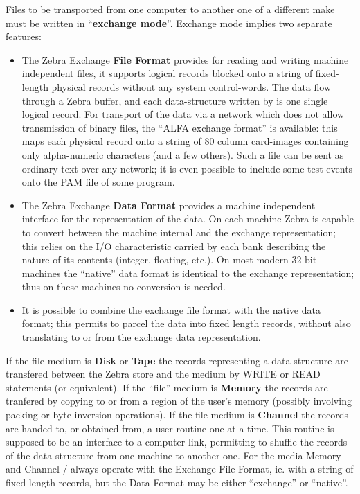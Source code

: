 Files to be transported from one computer to another one of a
different make must be written in
``\textbf{exchange mode}''.
Exchange mode implies two separate features:
\begin{itemize}
\item The Zebra Exchange \textbf{File Format}
      provides for reading and writing machine independent files,
      it supports logical records blocked
      onto a string of fixed-length physical records
      without any system control-words.
      The data flow through a Zebra buffer,
      and each data-structure written by  
      is one single logical record.
      For transport of the data via a network which does not allow
      transmission of binary files, 
      the ``ALFA exchange format'' is available:
      this maps each physical record onto a string of 
      80 column card-images
      containing only alpha-numeric characters (and a few others).
      Such a file can be sent as ordinary text over any network;
      it is even possible to include some test events onto the
      PAM file of some program.
\item The Zebra Exchange \textbf{Data Format}
      provides a machine independent interface for the representation
      of the data.
      On each machine Zebra is capable to convert between the
      machine internal and the exchange representation;
      this relies on the I/O characteristic carried by each bank describing
      the nature of its contents (integer, floating, etc.).
      On most modern 32-bit machines the ``native'' data format is identical
      to the exchange representation;
      thus on these machines no conversion is needed.
\item It is possible to combine the exchange file format
      with the native data format;
      this permits to parcel the data into fixed length records,
      without also translating to or from the exchange data
      representation.
\end{itemize}

If the file medium is \textbf{Disk} or \textbf{Tape}
the records representing a data-structure are transfered
between the Zebra store and the medium by WRITE or READ statements
(or equivalent).
If the ``file'' medium is \textbf{Memory}
the records are tranfered by copying to or from a region
of the user's memory
(possibly involving packing or byte inversion operations).
If the file medium is \textbf{Channel}
the records are handed to, or obtained from,
a user routine one at a time.
This routine is supposed to be an interface to a computer link,
permitting to shuffle the records of the data-structure
from one machine to another one.
For the media Memory and Channel / always operate
with the Exchange File Format,
ie. with a string of fixed length records,
but the Data Format may be either ``exchange'' or ``native''.

